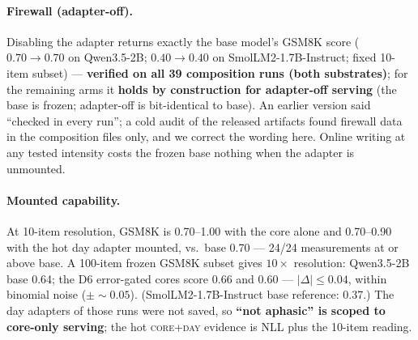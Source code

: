 \documentclass[11pt]{article}
\newcommand{\qwen}{Qwen3.5-2B}
\newcommand{\smol}{SmolLM2-1.7B-Instruct}
\begin{document}
\paragraph{Firewall (adapter-off).} Disabling the adapter returns exactly the base model's GSM8K
score ($0.70\to0.70$ on \qwen{}; $0.40\to0.40$ on \smol{}; fixed 10-item subset) ---
\textbf{verified on all 39 composition runs (both substrates)}; for the remaining arms it
\textbf{holds by construction for adapter-off serving} (the base is frozen; adapter-off is
bit-identical to base). An earlier version said ``checked in every run''; a cold audit of the
released artifacts found firewall data in the composition files only, and we correct the
wording here. Online writing at any tested intensity costs the frozen base nothing when the
adapter is unmounted.

\paragraph{Mounted capability.} At 10-item resolution, GSM8K is 0.70--1.00 with the core alone
and 0.70--0.90 with the hot day adapter mounted, vs.\ base 0.70 --- 24/24 measurements at or
above base. A 100-item frozen GSM8K subset gives $10\times$ resolution: \qwen{} base 0.64; the
D6 error-gated cores score 0.66 and 0.60 --- $|\Delta|\le0.04$, within binomial noise
($\pm{\sim}0.05$). (\smol{} base reference: 0.37.) The day adapters of those runs were not
saved, so \textbf{``not aphasic'' is scoped to core-only serving}; the hot \textsc{core+day}
evidence is NLL plus the 10-item reading.
\end{document}
